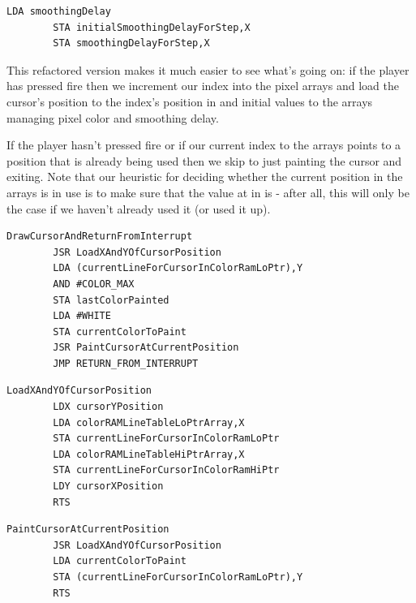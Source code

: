 {\begin{lstlisting}[basicstyle=\ttfamily\scriptsize]
        LDA smoothingDelay
        STA initialSmoothingDelayForStep,X
        STA smoothingDelayForStep,X
\end{lstlisting}

This refactored version makes it much easier to see what's going on: if the player has pressed fire then we increment
our index into the pixel arrays and load the cursor's position to the index's position in 
and initial values to the arrays managing pixel color and smoothing delay.

If the player hasn't pressed fire or if our current index to the arrays points to a position that is already being used then
we skip to just painting the cursor and exiting. Note that our heuristic for deciding whether the current position in the 
arrays is in use is to make sure that the value at  in  is  - 
after all, this will only be the case if we haven't already used it (or used it up).

\clearpage
\begin{lstlisting}[caption = Paint the cursor and call the system default interrupt handler \icode{RETURN\_FROM\_INTERRUPT}]
DrawCursorAndReturnFromInterrupt   
        JSR LoadXAndYOfCursorPosition
        LDA (currentLineForCursorInColorRamLoPtr),Y
        AND #COLOR_MAX
        STA lastColorPainted
        LDA #WHITE
        STA currentColorToPaint
        JSR PaintCursorAtCurrentPosition
        JMP RETURN_FROM_INTERRUPT

\end{lstlisting}

\bigskip
\begin{lstlisting}[caption= Load the X and Y position and set up \icode{currentLineForCursorInColorRamLoPtr/currentLineForCursorInColorRamHiPtr}
for painting the cursor.]
LoadXAndYOfCursorPosition   
        LDX cursorYPosition
        LDA colorRAMLineTableLoPtrArray,X
        STA currentLineForCursorInColorRamLoPtr
        LDA colorRAMLineTableHiPtrArray,X
        STA currentLineForCursorInColorRamHiPtr
        LDY cursorXPosition
        RTS 
\end{lstlisting}
\bigskip
\begin{lstlisting}[caption = Paint the cursor.]
PaintCursorAtCurrentPosition   
        JSR LoadXAndYOfCursorPosition
        LDA currentColorToPaint
        STA (currentLineForCursorInColorRamLoPtr),Y
        RTS 
\end{lstlisting}
\clearpage

}
